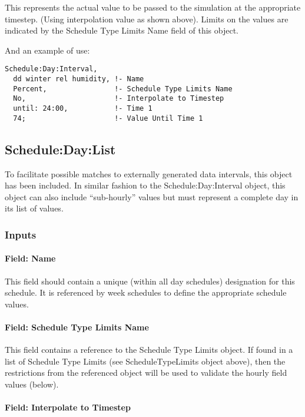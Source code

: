 This represents the actual value to be passed to the simulation at the appropriate timestep. (Using interpolation value as shown above). Limits on the values are indicated by the Schedule Type Limits Name field of this object.

And an example of use:

\begin{lstlisting}
Schedule:Day:Interval,
  dd winter rel humidity, !- Name
  Percent,                !- Schedule Type Limits Name
  No,                     !- Interpolate to Timestep
  until: 24:00,           !- Time 1
  74;                     !- Value Until Time 1
\end{lstlisting}

\subsection{Schedule:Day:List}\label{scheduledaylist}

To facilitate possible matches to externally generated data intervals, this object has been included. In similar fashion to the Schedule:Day:Interval object, this object can also include ``sub-hourly'' values but must represent a complete day in its list of values.

\subsubsection{Inputs}\label{inputs-3-032}

\paragraph{Field: Name}\label{field-name-3-028}

This field should contain a unique (within all day schedules) designation for this schedule. It is referenced by week schedules to define the appropriate schedule values.

\paragraph{Field: Schedule Type Limits Name}\label{field-schedule-type-limits-name-2-000}

This field contains a reference to the Schedule Type Limits object. If found in a list of Schedule Type Limits (see ScheduleTypeLimits object above), then the restrictions from the referenced object will be used to validate the hourly field values (below).

\paragraph{Field: Interpolate to Timestep}\label{field-interpolate-to-timestep-1}

